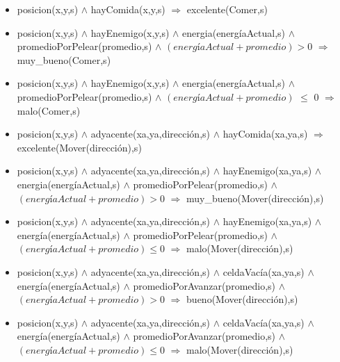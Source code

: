 \begin{itemize}

\item posicion(x,y,s) $\land$ hayComida(x,y,s) $\Rightarrow$ excelente(Comer,s)

\item posicion(x,y,s) $\land$ hayEnemigo(x,y,s) $\land$ energia(energíaActual,s)
$\land$ promedioPorPelear(promedio,s) $\land$ $(energíaActual + promedio) > 0$
$\Rightarrow$ \linebreak muy\_bueno(Comer,s)

\item posicion(x,y,s) $\land$ hayEnemigo(x,y,s) $\land$ energia(energíaActual,s)
$\land$ promedioPorPelear(promedio,s) $\land$ $(energíaActual + promedio)$ $\le$ 0
$\Rightarrow$ malo(Comer,s)

\item posicion(x,y,s) $\land$ adyacente(xa,ya,dirección,s) $\land$
hayComida(xa,ya,s) $\Rightarrow$ excelente(Mover(dirección),s)

\item posicion(x,y,s) $\land$ adyacente(xa,ya,dirección,s) $\land$
hayEnemigo(xa,ya,s) $\land$ energia(energíaActual,s) $\land$
promedioPorPelear(promedio,s) $\land$ $(energíaActual + promedio) > 0$ $\Rightarrow$
muy\_bueno(Mover(dirección),s)

\item posicion(x,y,s) $\land$ adyacente(xa,ya,dirección,s) $\land$
hayEnemigo(xa,ya,s) $\land$ energía(energíaActual,s) $\land$
promedioPorPelear(promedio,s) $\land$ $(energíaActual + promedio) \le 0$
$\Rightarrow$ malo(Mover(dirección),s)

\item posicion(x,y,s) $\land$ adyacente(xa,ya,dirección,s) $\land$
celdaVacía(xa,ya,s) $\land$ energía(energíaActual,s) $\land$
promedioPorAvanzar(promedio,s) $\land$ $(energíaActual + promedio) > 0$ $\Rightarrow$
bueno(Mover(dirección),s)

\item posicion(x,y,s) $\land$ adyacente(xa,ya,dirección,s) $\land$
celdaVacía(xa,ya,s) $\land$ energía(energíaActual,s) $\land$
promedioPorAvanzar(promedio,s) $\land$ $(energíaActual + promedio) \le 0$
$\Rightarrow$ malo(Mover(dirección),s)

\end{itemize}

